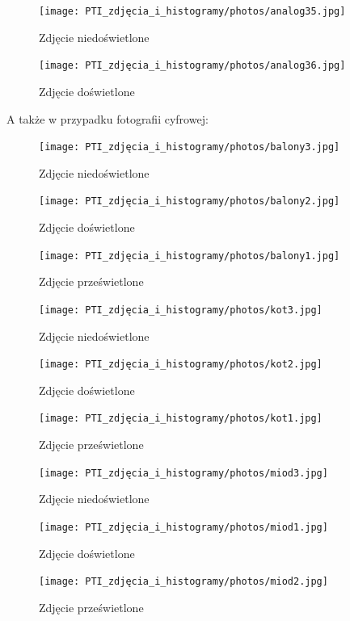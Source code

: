 \documentclass[options]{mwart}
\begin{document}
\begin{figure}[H]
    \centering
    \texttt{[image: PTI\_zdjęcia\_i\_histogramy/photos/analog35.jpg]}
    \caption{Zdjęcie niedoświetlone}
\end{figure}
\begin{figure}[H]
    \centering
    \texttt{[image: PTI\_zdjęcia\_i\_histogramy/photos/analog36.jpg]}
    \caption{Zdjęcie doświetlone}
\end{figure}


\newpage
A także w przypadku fotografii cyfrowej:

\begin{figure}[H]
    \centering
    \texttt{[image: PTI\_zdjęcia\_i\_histogramy/photos/balony3.jpg]}
    \caption{Zdjęcie niedoświetlone}
\end{figure}
\begin{figure}[H]
    \centering
    \texttt{[image: PTI\_zdjęcia\_i\_histogramy/photos/balony2.jpg]}
    \caption{Zdjęcie doświetlone}
\end{figure}
\begin{figure}[H]
    \centering
    \texttt{[image: PTI\_zdjęcia\_i\_histogramy/photos/balony1.jpg]}
    \caption{Zdjęcie prześwietlone}
\end{figure}


\begin{figure}[H]
    \centering
    \texttt{[image: PTI\_zdjęcia\_i\_histogramy/photos/kot3.jpg]}
    \caption{Zdjęcie niedoświetlone}
\end{figure}
\begin{figure}[H]
    \centering
    \texttt{[image: PTI\_zdjęcia\_i\_histogramy/photos/kot2.jpg]}
    \caption{Zdjęcie doświetlone}
\end{figure}
\begin{figure}[H]
    \centering
    \texttt{[image: PTI\_zdjęcia\_i\_histogramy/photos/kot1.jpg]}
    \caption{Zdjęcie prześwietlone}
\end{figure}

\begin{figure}[H]
    \centering
    \texttt{[image: PTI\_zdjęcia\_i\_histogramy/photos/miod3.jpg]}
    \caption{Zdjęcie niedoświetlone}
\end{figure}
\begin{figure}[H]
    \centering
    \texttt{[image: PTI\_zdjęcia\_i\_histogramy/photos/miod1.jpg]}
    \caption{Zdjęcie doświetlone}
\end{figure}
\begin{figure}[H]
    \centering
    \texttt{[image: PTI\_zdjęcia\_i\_histogramy/photos/miod2.jpg]}
    \caption{Zdjęcie prześwietlone}
\end{figure}
\end{document}
